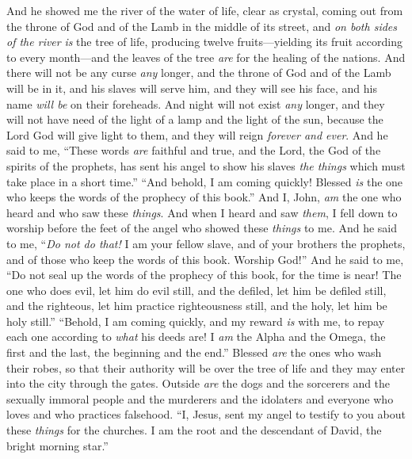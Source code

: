 \begin{biblechapter} %
 And he showed me the river of the water of life, clear as crystal, coming out from the throne of God and of the Lamb
\verse in the middle of its street, and \textit{on both sides of the river} \textit{is} the tree of life, producing twelve fruits—yielding its fruit according to every month—and the leaves of the tree \textit{are} for the healing of the nations.
\verse And there will not be any curse \textit{any} longer, and the throne of God and of the Lamb will be in it, and his slaves will serve him,
\verse and they will see his face, and his name \textit{will be} on their foreheads.
\verse And night will not exist \textit{any} longer, and they will not have need of the light of a lamp and the light of the sun, because the Lord God will give light to them, and they will reign \textit{forever and ever}.
 And he said to me, “These words \textit{are} faithful and true, and the Lord, the God of the spirits of the prophets, has sent his angel to show his slaves \textit{the things} which must take place in a short time.”
\verse “And behold, I am coming quickly! Blessed \textit{is} the one who keeps the words of the prophecy of this book.”
\verse And I, John, \textit{am} the one who heard and who saw these \textit{things}. And when I heard and saw \textit{them}, I fell down to worship before the feet of the angel who showed these \textit{things} to me.
\verse And he said to me, “\textit{Do not do that!} I am your fellow slave, and of your brothers the prophets, and of those who keep the words of this book. Worship God!”
\verse And he said to me, “Do not seal up the words of the prophecy of this book, for the time is near!
\verse The one who does evil, let him do evil still, and the defiled, let him be defiled still, and the righteous, let him practice righteousness still, and the holy, let him be holy still.”
\verse “Behold, I am coming quickly, and my reward \textit{is} with me, to repay each one according to \textit{what} his deeds are!
\verse I \textit{am} the Alpha and the Omega, the first and the last, the beginning and the end.”
\verse Blessed \textit{are} the ones who wash their robes, so that their authority will be over the tree of life and they may enter into the city through the gates.
\verse Outside \textit{are} the dogs and the sorcerers and the sexually immoral people and the murderers and the idolaters and everyone who loves and who practices falsehood.
\verse “I, Jesus, sent my angel to testify to you about these \textit{things} for the churches. I am the root and the descendant of David, the bright morning star.”

\end{biblechapter}
